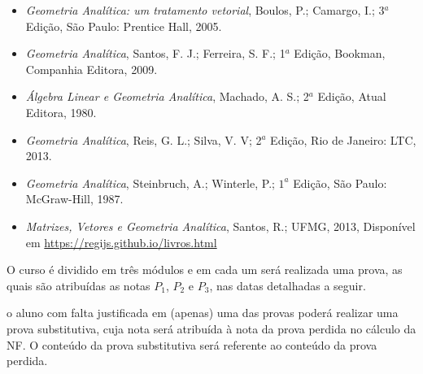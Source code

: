 \documentclass[12pt]{exam}
\begin{document}
\begin{itemize}

    \item {\it Geometria Analítica: um tratamento vetorial}, Boulos, P.; Camargo, I.; 3$^a$ Edição, São Paulo: Prentice Hall, 2005.

    \item {\it Geometria Analítica},  Santos, F. J.; Ferreira, S. F.; 1$^{a}$ Edição, Bookman, Companhia Editora, 2009.

    \item {\it Álgebra Linear e Geometria Analítica}, Machado, A. S.; 2$^a$ Edição, Atual Editora, 1980.

    \item {\it Geometria Analítica}, Reis, G. L.; Silva, V. V; 2$^a$ Edição, Rio de Janeiro: LTC, 2013.

    \item {\it Geometria Analítica}, Steinbruch, A.; Winterle, P.; $1^a$ Edição, São Paulo: McGraw-Hill, 1987.

    \item {\it Matrizes, Vetores e Geometria Analítica}, Santos, R.;  UFMG, 2013, Disponível em \url{https://regijs.github.io/livros.html}

\end{itemize}

 O curso é dividido em três módulos e em cada um será realizada uma prova, as quais são atribuídas as notas $P_1$, $P_2$ e $P_3$, nas datas detalhadas a seguir.

 o aluno com falta justificada em (apenas) uma das provas poderá realizar uma prova substitutiva, cuja nota será atribuída à
nota da prova perdida no cálculo da NF. O conteúdo da prova substitutiva será referente ao conteúdo da prova perdida.
\end{document}
